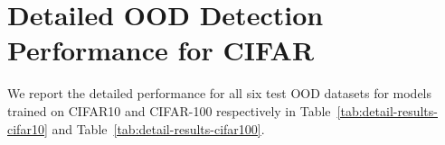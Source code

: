 \documentclass[runningheads]{llncs}
\begin{document}
\section{Detailed OOD Detection Performance for CIFAR}
\label{sec:detailed-cifar}
We report the detailed performance for all six test OOD datasets for models trained on CIFAR10 and CIFAR-100 respectively in Table~\ref{tab:detail-results-cifar10}
 and Table~\ref{tab:detail-results-cifar100}.
 




\begin{sidewaystable}
\caption{\small Detailed results on six common OOD benchmark datasets: \texttt{Textures}~\cite{cimpoi2014describing}, \texttt{SVHN}~\cite{netzer2011reading}, \texttt{Places365}~\cite{zhou2017places}, \texttt{LSUN-Crop}~\cite{yu2015lsun}, \texttt{LSUN-Resize}~\cite{yu2015lsun}, and \texttt{iSUN}~\cite{xu2015turkergaze}. For each ID dataset, we use the same DenseNet pretrained on \textbf{CIFAR-10}. $\uparrow$ indicates larger values are better and $\downarrow$ indicates smaller values are better.}
\end{sidewaystable}
\end{document}

